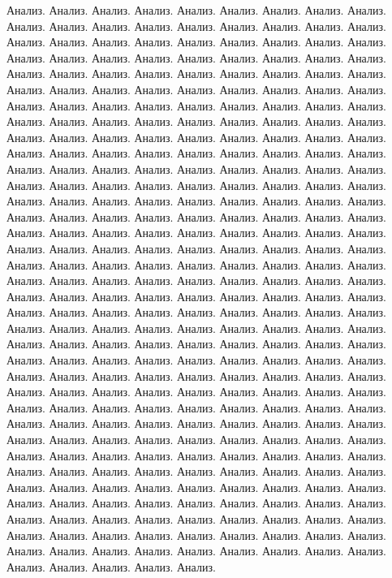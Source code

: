 Анализ. Анализ. Анализ. Анализ. Анализ. Анализ. Анализ. Анализ. Анализ. Анализ. Анализ. 
Анализ. Анализ. Анализ. Анализ. Анализ. 
Анализ. Анализ. Анализ. Анализ. Анализ. Анализ. Анализ. Анализ. Анализ. Анализ. Анализ. 
Анализ. Анализ. Анализ. Анализ. Анализ. 
Анализ. Анализ. Анализ. Анализ. Анализ. Анализ. Анализ. Анализ. Анализ. Анализ. Анализ. 
Анализ. Анализ. Анализ. Анализ. Анализ. 
Анализ. Анализ. Анализ. Анализ. Анализ. Анализ. Анализ. Анализ. Анализ. Анализ. Анализ. 
Анализ. Анализ. Анализ. Анализ. Анализ. 
Анализ. Анализ. Анализ. Анализ. Анализ. Анализ. Анализ. Анализ. Анализ. Анализ. Анализ. 
Анализ. Анализ. Анализ. Анализ. Анализ. 
Анализ. Анализ. Анализ. Анализ. Анализ. Анализ. Анализ. Анализ. Анализ. Анализ. Анализ. 
Анализ. Анализ. Анализ. Анализ. Анализ. 
Анализ. Анализ. Анализ. Анализ. Анализ. Анализ. Анализ. Анализ. Анализ. Анализ. Анализ. 
Анализ. Анализ. Анализ. Анализ. Анализ. 
Анализ. Анализ. Анализ. Анализ. Анализ. Анализ. Анализ. Анализ. Анализ. Анализ. Анализ. 
Анализ. Анализ. Анализ. Анализ. Анализ. 
Анализ. Анализ. Анализ. Анализ. Анализ. Анализ. Анализ. Анализ. Анализ. Анализ. Анализ. 
Анализ. Анализ. Анализ. Анализ. Анализ. 
Анализ. Анализ. Анализ. Анализ. Анализ. Анализ. Анализ. Анализ. Анализ. Анализ. Анализ. 
Анализ. Анализ. Анализ. Анализ. Анализ. 
Анализ. Анализ. Анализ. Анализ. Анализ. Анализ. Анализ. Анализ. Анализ. Анализ. Анализ. 
Анализ. Анализ. Анализ. Анализ. Анализ. 
Анализ. Анализ. Анализ. Анализ. Анализ. Анализ. Анализ. Анализ. Анализ. Анализ. Анализ. 
Анализ. Анализ. Анализ. Анализ. Анализ. 
Анализ. Анализ. Анализ. Анализ. Анализ. Анализ. Анализ. Анализ. Анализ. Анализ. Анализ. 
Анализ. Анализ. Анализ. Анализ. Анализ. 
Анализ. Анализ. Анализ. Анализ. Анализ. Анализ. Анализ. Анализ. Анализ. Анализ. Анализ. 
Анализ. Анализ. Анализ. Анализ. Анализ. 
Анализ. Анализ. Анализ. Анализ. Анализ. Анализ. Анализ. Анализ. Анализ. Анализ. Анализ. 
Анализ. Анализ. Анализ. Анализ. Анализ. 
Анализ. Анализ. Анализ. Анализ. Анализ. Анализ. Анализ. Анализ. Анализ. Анализ. Анализ. 
Анализ. Анализ. Анализ. Анализ. Анализ. 
Анализ. Анализ. Анализ. Анализ. Анализ. Анализ. Анализ. Анализ. Анализ. Анализ. Анализ. 
Анализ. Анализ. Анализ. Анализ. Анализ. 
Анализ. Анализ. Анализ. Анализ. Анализ. Анализ. Анализ. Анализ. Анализ. Анализ. Анализ. 
Анализ. Анализ. Анализ. Анализ. Анализ. 
Анализ. Анализ. Анализ. Анализ. Анализ. Анализ. Анализ. Анализ. Анализ. Анализ. Анализ. 
Анализ. Анализ. Анализ. Анализ. Анализ. 
Анализ. Анализ. Анализ. Анализ. Анализ. Анализ. Анализ. Анализ. Анализ. Анализ. Анализ. 
Анализ. Анализ. Анализ. Анализ. Анализ. 
